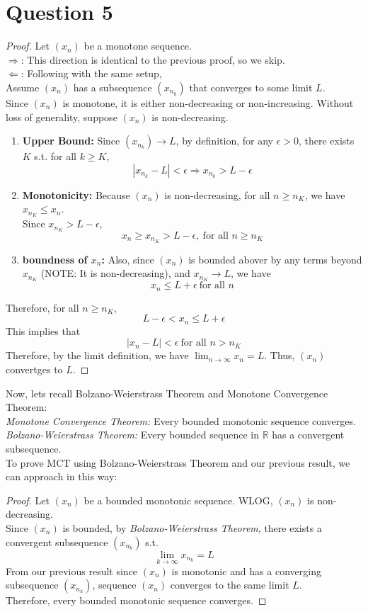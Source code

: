 \documentclass{article}
\begin{document}
\section*{Question 5}
\begin{proof}
    Let $(x_n)$ be a monotone sequence.
    \\
    $\Rightarrow$: This direction is identical to the previous proof, so we skip.
    \\
    $\Leftarrow$: Following with the same setup, 
    \\
    Assume $(x_n)$ has a subsequence $(x_{n_k})$ that converges to some limit $L$.
    \\
    Since $(x_n)$ is monotone, it is either non-decreasing or non-increasing. Without loss of generality, suppose $(x_n)$ is non-decreasing.
    \begin{enumerate}
        \item \textbf{Upper Bound: } Since $(x_{n_k}) \rightarrow L$, by definition, for any $\epsilon > 0$, there exists $K$ s.t. for all $k \geq K$,
        \[ |x_{n_k} - L| < \epsilon \Longrightarrow x_{n_k} > L - \epsilon \]
        \item \textbf{Monotonicity: } Because $(x_n)$ is non-decreasing, for all $n \geq n_K$, we have \( x_n_K \leq x_n \).
        \\
        Since $x_{n_K} > L - \epsilon$, 
        \[ x_n \geq x_{n_K} > L - \epsilon, \ \text{for all } n \geq n_K \]
        \item \textbf{boundness of $x_n$: } Also, since $(x_n)$ is bounded abover by any terms beyond $x_{n_K}$ (NOTE: It is non-decreasing), and $x_{n_K} \rightarrow L$, we have
        \[ x_n \leq L + \epsilon \ \text{for all } n \]
    \end{enumerate}
    Therefore, for all $n \geq n_K$,
    \[ L - \epsilon < x_n \leq L + \epsilon \]
    This implies that
    \[ |x_n - L| < \epsilon \ \text{for all } n > n_K \]
    Therefore, by the limit definition, we have $\lim_{n \rightarrow \infty} x_n = L$. Thus, $(x_n)$ convertges to $L$.
\end{proof}

\noindent Now, lets recall Bolzano-Weierstrass Theorem and Monotone Convergence Theorem:
\\
\textit{Monotone Convergence Theorem: } Every bounded monotonic sequence converges.
\\
\textit{Bolzano-Weierstrass Theorem: } Every bounded sequence in $\mathbb{R}$ has a convergent subsequence.
\\
To prove MCT using Bolzano-Weierstrass Theorem and our previous result, we can approach in this way:
\begin{proof}
    Let $(x_n)$ be a bounded monotonic sequence. WLOG, $(x_n)$ is non-decreasing.
    \\
    Since $(x_n)$ is bounded, by \textit{Bolzano-Weierstrass Theorem}, there exists a convergent subsequence $(x_{n_k})$ s.t.
    \[ \lim_{k \rightarrow \infty} x_{n_k} = L \]
    From our previous result since $(x_n)$ is monotonic and has a converging subsequence $(x_{n_k})$, sequence $(x_n)$ converges to the same limit $L$.
    \\
    Therefore, every bounded monotonic sequence converges.
\end{proof}
\end{document}

